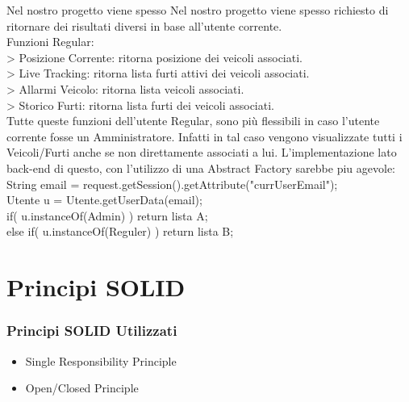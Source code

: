 \documentclass[a4paper,12pt]{beamer}
\begin{document}
\begin{frame}
Nel nostro progetto viene spesso 
Nel nostro progetto viene spesso richiesto di ritornare dei risultati diversi in base all'utente corrente.\\
Funzioni Regular:\\
> Posizione Corrente: ritorna posizione dei veicoli associati.\\
> Live Tracking: ritorna lista furti attivi dei veicoli associati.\\
> Allarmi Veicolo: ritorna lista veicoli associati.\\
> Storico Furti: ritorna lista furti dei veicoli associati.\\
Tutte queste funzioni dell'utente Regular, sono più flessibili in caso l'utente corrente fosse un Amministratore. Infatti in tal caso vengono visualizzate tutti i Veicoli/Furti anche se non direttamente associati a lui.
L'implementazione lato back-end di questo, con l'utilizzo di una Abstract Factory sarebbe piu agevole:\\
\small{
String email = request.getSession().getAttribute("currUserEmail");\\
Utente u = Utente.getUserData(email);\\
if( u.instanceOf(Admin) ) return lista A;\\
else if( u.instanceOf(Reguler) ) return lista B;}
\end{frame}

\pagebreak

\section{Principi SOLID}
\begin{frame}
\frametitle{Principi SOLID Utilizzati}
\begin{itemize}
\item Single Responsibility Principle
\item Open/Closed Principle
\end{itemize}
\end{frame}

\pagebreak
\end{document}
